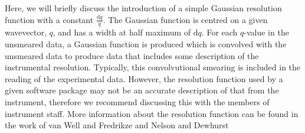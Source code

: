 \documentclass[
 reprint,
 superscriptaddress,
 amsmath,amssymb,
 aps,
]{revtex4-1}
\begin{document}
Here, we will briefly discuss the introduction of a simple Gaussian resolution function with a constant $\frac{\text{d}q}{q}$.
The Gaussian function is centred on a given wavevector, $q$, and has a width at half maximum of $\text{d}q$.
For each $q$-value in the unsmeared data, a Gaussian function is produced which is convolved with the unsmeared data to produce data that includes some description of the instrumental resolution.
Typically, this convolvutional smearing is included in the reading of the experimental data.
However, the resolution function used by a given software package may not be an accurate description of that from the instrument, therefore we recommend discussing this with the members of instrument staff.
More information about the resolution function can be found in the work of van Well and Fredrikze \cite{vanwell_resolution_2005} and Nelson and Dewhurst \cite{nelson_towards_2013,nelson_towards_2014}
\end{document}
